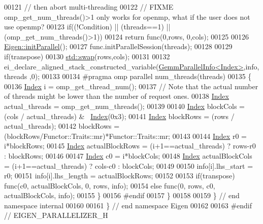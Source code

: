 \begin{DoxyCode}
00121   \textcolor{comment}{// then abort multi-threading}
00122   \textcolor{comment}{// FIXME omp\_get\_num\_threads()>1 only works for openmp, what if the user does not use openmp?}
00123   \textcolor{keywordflow}{if}((!Condition) || (threads==1) || (omp\_get\_num\_threads()>1))
00124     \textcolor{keywordflow}{return} func(0,rows, 0,cols);
00125 
00126   \hyperlink{namespace_eigen_a820c0e0460934cc17eb6dacbad54a9f5}{Eigen::initParallel}();
00127   func.initParallelSession(threads);
00128 
00129   \textcolor{keywordflow}{if}(transpose)
00130     \hyperlink{endian_8c_a3ca5ecd34b04d6a243c054ac3a57f68d}{std::swap}(rows,cols);
00131 
00132   ei\_declare\_aligned\_stack\_constructed\_variable(\hyperlink{struct_eigen_1_1internal_1_1_gemm_parallel_info}{GemmParallelInfo<Index>},info,threads
      ,0);
00133 
00134 \textcolor{preprocessor}{  #pragma omp parallel num\_threads(threads)}
00135   \{
00136     \hyperlink{namespace_eigen_a62e77e0933482dafde8fe197d9a2cfde}{Index} i = omp\_get\_thread\_num();
00137     \textcolor{comment}{// Note that the actual number of threads might be lower than the number of request ones.}
00138     \hyperlink{namespace_eigen_a62e77e0933482dafde8fe197d9a2cfde}{Index} actual\_threads = omp\_get\_num\_threads();
00139 
00140     \hyperlink{namespace_eigen_a62e77e0933482dafde8fe197d9a2cfde}{Index} blockCols = (cols / actual\_threads) & ~\hyperlink{namespace_eigen_a62e77e0933482dafde8fe197d9a2cfde}{Index}(0x3);
00141     \hyperlink{namespace_eigen_a62e77e0933482dafde8fe197d9a2cfde}{Index} blockRows = (rows / actual\_threads);
00142     blockRows = (blockRows/Functor::Traits::mr)*Functor::Traits::mr;
00143 
00144     \hyperlink{namespace_eigen_a62e77e0933482dafde8fe197d9a2cfde}{Index} r0 = i*blockRows;
00145     \hyperlink{namespace_eigen_a62e77e0933482dafde8fe197d9a2cfde}{Index} actualBlockRows = (i+1==actual\_threads) ? rows-r0 : blockRows;
00146 
00147     \hyperlink{namespace_eigen_a62e77e0933482dafde8fe197d9a2cfde}{Index} c0 = i*blockCols;
00148     \hyperlink{namespace_eigen_a62e77e0933482dafde8fe197d9a2cfde}{Index} actualBlockCols = (i+1==actual\_threads) ? cols-c0 : blockCols;
00149 
00150     info[i].lhs\_start = r0;
00151     info[i].lhs\_length = actualBlockRows;
00152 
00153     \textcolor{keywordflow}{if}(transpose) func(c0, actualBlockCols, 0, rows, info);
00154     \textcolor{keywordflow}{else}          func(0, rows, c0, actualBlockCols, info);
00155   \}
00156 \textcolor{preprocessor}{#endif}
00157 \}
00158 
00159 \} \textcolor{comment}{// end namespace internal}
00160 
00161 \} \textcolor{comment}{// end namespace Eigen}
00162 
00163 \textcolor{preprocessor}{#endif // EIGEN\_PARALLELIZER\_H}
\end{DoxyCode}
